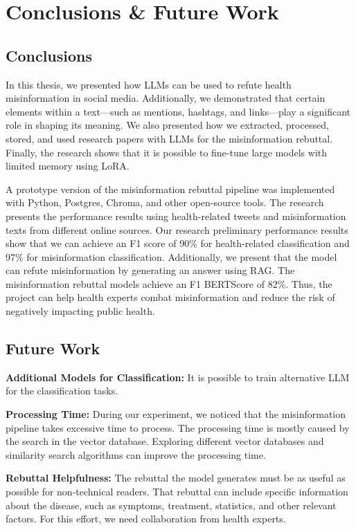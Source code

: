 



\chapter{Conclusions \& Future Work}  

\section{Conclusions}
\noindent In this thesis, we presented how LLMs can be used to refute health misinformation in social media. Additionally, we demonstrated that certain elements within a text—such as mentions, hashtags, and links—play a significant role in shaping its meaning. We also presented how we extracted, processed, stored, and used research papers with LLMs for the misinformation rebuttal. Finally, the research shows that it is possible to fine-tune large models with limited memory using LoRA.

A prototype version of the misinformation rebuttal pipeline was implemented with Python, Postgres, Chroma, and other open-source tools. The research presents the performance results using health-related tweets and misinformation texts from different online sources. Our research preliminary performance results show that we can achieve an F1 score of 90\% for health-related classification and 97\% for misinformation classification. Additionally, we present that the model can refute misinformation by generating an answer using RAG. The misinformation rebuttal models achieve an F1 BERTScore of 82\%. Thus, the project can help health experts combat misinformation and reduce the risk of negatively impacting public health.

\section{Future Work}

\begin{description}

\item{\textbf{Additional Models for Classification:}} It is possible to train alternative LLM for the classification tasks. 

\item{\textbf{Processing Time:}} During our experiment, we noticed that the misinformation pipeline takes excessive time to process. The processing time is mostly caused by the search in the vector database. Exploring different vector databases and similarity search algorithms can improve the processing time.

\item{\textbf{Rebuttal Helpfulness:}} The rebuttal the model generates must be as useful as possible for non-technical readers. That rebuttal can include specific information about the disease, such as symptoms, treatment, statistics, and other relevant factors. For this effort, we need 
collaboration from health experts.

\end{description}